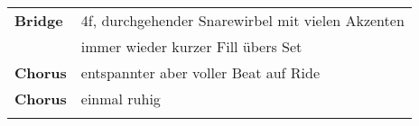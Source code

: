 \begin{tabular}{p{1.6cm}l}
	\textbf{Bridge} & 4f, durchgehender Snarewirbel mit vielen Akzenten                 \\ %
	                & immer wieder kurzer Fill übers Set                                \\ %
	\textbf{Chorus} & entspannter aber voller Beat auf Ride                             \\ %
	\textbf{Chorus} & einmal ruhig                                                      \\ %
	                &                                                                   \\
\end{tabular}
